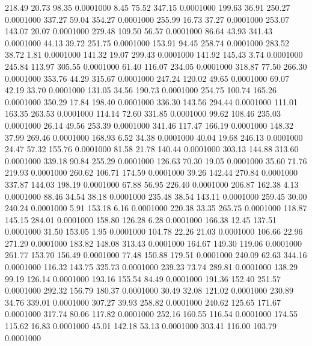  218.49   20.73   98.35   0.0001000
   8.45   75.52  347.15   0.0001000
 199.63   36.91  250.27   0.0001000
 337.27   59.04  354.27   0.0001000
 255.99   16.73   37.27   0.0001000
 253.07  143.07   20.07   0.0001000
 279.48  109.50   56.57   0.0001000
  86.64   43.93  341.43   0.0001000
  44.13   39.72  251.75   0.0001000
 153.91   94.45  258.74   0.0001000
 283.52   38.72    1.81   0.0001000
 141.32   19.07  299.43   0.0001000
 141.92  145.43    3.74   0.0001000
 245.84  113.97  305.55   0.0001000
  61.40  116.07  234.05   0.0001000
 318.87   77.50  266.30   0.0001000
 353.76   44.29  315.67   0.0001000
 247.24  120.02   49.65   0.0001000
  69.07   42.19   33.70   0.0001000
 131.05   34.56  190.73   0.0001000
 254.75  100.74  165.26   0.0001000
 350.29   17.84  198.40   0.0001000
 336.30  143.56  294.44   0.0001000
 111.01  163.35  263.53   0.0001000
 114.14   72.60  331.85   0.0001000
  99.62  108.46  235.03   0.0001000
  26.14   49.56  253.39   0.0001000
 341.46  117.47  166.19   0.0001000
 148.32   37.99  269.46   0.0001000
 168.93    6.52   34.38   0.0001000
  40.04   19.68  246.13   0.0001000
  24.47   57.32  155.76   0.0001000
  81.58   21.78  140.44   0.0001000
 303.13  144.88  313.60   0.0001000
 339.18   90.84  255.29   0.0001000
 126.63   70.30   19.05   0.0001000
  35.60   71.76  219.93   0.0001000
 260.62  106.71  174.59   0.0001000
  39.26  142.44  270.84   0.0001000
 337.87  144.03  198.19   0.0001000
  67.88   56.95  226.40   0.0001000
 206.87  162.38    4.13   0.0001000
  88.46   34.54   38.18   0.0001000
 235.48   38.54  143.11   0.0001000
 259.45   30.00  240.24   0.0001000
   5.91  153.18    6.16   0.0001000
 220.38   33.35  265.75   0.0001000
 118.87  145.15  284.01   0.0001000
 158.80  126.28    6.28   0.0001000
 166.38   12.45  137.51   0.0001000
  31.50  153.05    1.95   0.0001000
 104.78   22.26   21.03   0.0001000
 106.66   22.96  271.29   0.0001000
 183.82  148.08  313.43   0.0001000
 164.67  149.30  119.06   0.0001000
 261.77  153.70  156.49   0.0001000
  77.48  150.88  179.51   0.0001000
 240.09   62.63  344.16   0.0001000
 116.32  143.75  325.73   0.0001000
 239.23   73.74  289.81   0.0001000
 138.29   99.19  126.14   0.0001000
 193.16  155.54   84.49   0.0001000
 191.36  152.40  251.57   0.0001000
 292.32  156.79  180.37   0.0001000
  30.49   32.08  121.02   0.0001000
 230.89   34.76  339.01   0.0001000
 307.27   39.93  258.82   0.0001000
 240.62  125.65  171.67   0.0001000
 317.74   80.06  117.82   0.0001000
 252.16  160.55  116.54   0.0001000
 174.55  115.62   16.83   0.0001000
  45.01  142.18   53.13   0.0001000
 303.41  116.00  103.79   0.0001000
